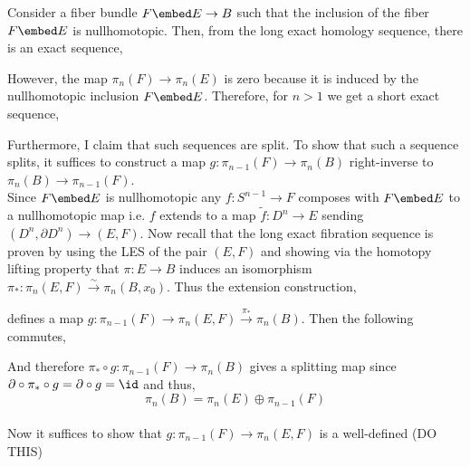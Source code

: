 \documentclass[12pt]{extarticle}
\begin{document}
Consider a fiber bundle $F \embed E \to B$ such that the inclusion of the fiber $F \embed E$ is nullhomotopic. Then, from the long exact homology sequence, there is an exact sequence,
\begin{center}
\end{center}
However, the map $\pi_n(F) \to \pi_n(E)$ is zero because it is induced by the nullhomotopic inclusion $F \embed E$. Therefore, for $n > 1$ we get a short exact sequence,
\begin{center}
\end{center} 
Furthermore, I claim that such sequences are split. To show that such a sequence splits, it suffices to construct a map $g : \pi_{n-1}(F) \to \pi_n(B)$ right-inverse to $\pi_n(B) \to \pi_{n-1}(F)$. 
\bigskip\\
Since $F \embed E$ is nullhomotopic any $f : S^{n-1} \to F$ composes with $F \embed E$ to a nullhomotopic map i.e. $f$ extends to a map $\tilde{f} : D^n \to E$ sending $(D^n, \partial D^n) \to (E, F)$. Now recall that the long exact fibration sequence is proven by using the LES of the pair $(E, F)$ and showing via the homotopy lifting property that $\pi : E \to B$ induces an isomorphism $\pi_* : \pi_n(E, F) \xrightarrow{\sim} \pi_n(B, x_0)$. Thus the extension construction,
\begin{center}
\end{center} 
defines a map $g : \pi_{n-1}(F) \to \pi_n(E, F) \xrightarrow{\pi_*} \pi_n(B)$. Then the following commutes,
\begin{center}
\end{center}
And therefore $\pi_* \circ g : \pi_{n-1}(F) \to \pi_n(B)$ gives a splitting map since $\partial \circ \pi_* \circ g = \partial \circ g = \id$ and thus,
\[ \pi_n(B) = \pi_n(E) \oplus \pi_{n-1}(F) \]
\bigskip\\
Now it suffices to show that $g : \pi_{n-1}(F) \to \pi_n(E, F)$ is a well-defined (DO THIS)
\end{document}
